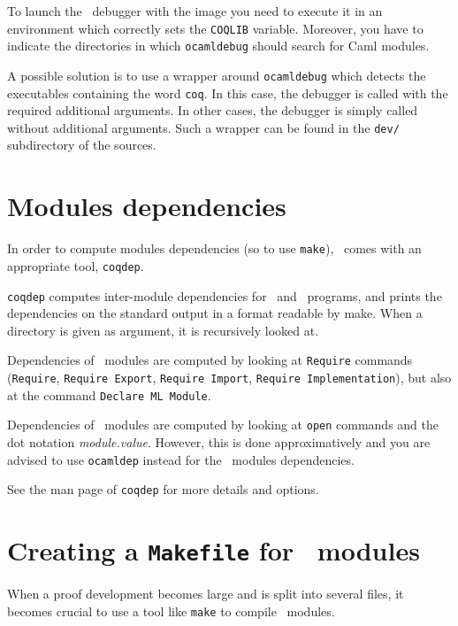 To launch the \ocaml\ debugger with the image you need to execute it in
an environment which correctly sets the \texttt{COQLIB} variable.
Moreover, you have to indicate the directories in which
\texttt{ocamldebug} should search for Caml modules.

A possible solution is to use a wrapper around \texttt{ocamldebug}
which detects the executables containing the word \texttt{coq}. In
this case, the debugger is called with the required additional
arguments. In other cases, the debugger is simply called without additional
arguments. Such a wrapper can be found in the \texttt{dev/}
subdirectory of the sources. 

\section{Modules dependencies}\label{Dependencies}

In order to compute modules dependencies (so to use {\tt make}),
\Coq\ comes with an appropriate tool, {\tt coqdep}.

{\tt coqdep} computes inter-module dependencies for \Coq\ and
\ocaml\ programs, and prints the dependencies on the standard
output in a format readable by make.  When a directory is given as
argument, it is recursively looked at.

Dependencies of \Coq\ modules are computed by looking at {\tt Require}
commands ({\tt Require}, {\tt Requi\-re Export}, {\tt Require Import},
{\tt Require Implementation}), but also at the command {\tt Declare ML Module}.

Dependencies of \ocaml\ modules are computed by looking at
\verb!open! commands and the dot notation {\em module.value}. However,
this is done approximatively and you are advised to use {\tt ocamldep}
instead for the \ocaml\ modules dependencies.

See the man page of {\tt coqdep} for more details and options.


\section{Creating a {\tt Makefile} for \Coq\ modules}
\label{Makefile}

When a proof development becomes large and is split into several files,
it becomes crucial to use a tool like {\tt make} to compile \Coq\
modules.

